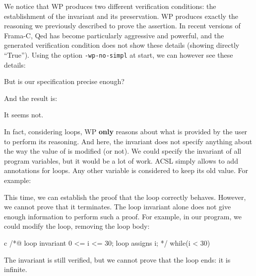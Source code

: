 

We notice that WP produces two different verification conditions: the
establishment of the invariant and its preservation. WP produces exactly
the reasoning we previously described to prove the assertion. In recent
versions of Frama-C, Qed has become particularly aggressive and
powerful, and the generated verification condition does not show these details
(showing directly ``True''). Using the option \texttt{-wp-no-simpl} at
start, we can however see these details:





But is our specification precise enough?






And the result is:





It seems not.





In fact, considering loops, WP \textbf{only} reasons about what is
provided by the user to perform its reasoning. And here, the invariant
does not specify anything about the way the value of  is
modified (or not). We could specify the invariant of all program
variables, but it would be a lot of work. ACSL simply allows to add
 annotations for loops. Any other variable is considered
to keep its old value. For example:






This time, we can establish the proof that the loop correctly behaves.
However, we cannot prove that it terminates. The loop invariant alone
does not give enough information to perform such a proof. For example,
in our program, we could modify the loop, removing the loop body:



\begin{CodeBlock}{c}
/*@
  loop invariant 0 <= i <= 30;
  loop assigns i;
*/
while(i < 30){
   
}
\end{CodeBlock}



The invariant is still verified, but we cannot prove that the loop ends:
it is infinite.



